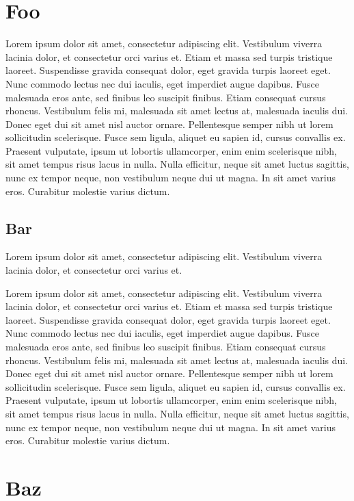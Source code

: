 

\chapter{Foo}

Lorem ipsum dolor sit amet, consectetur adipiscing elit. Vestibulum viverra
lacinia dolor, et consectetur orci varius et. Etiam et massa sed turpis
tristique laoreet. Suspendisse gravida consequat dolor, eget gravida turpis
laoreet eget. Nunc commodo lectus nec dui iaculis, eget imperdiet augue dapibus.
Fusce malesuada eros ante, sed finibus leo suscipit finibus. Etiam consequat
cursus rhoncus. Vestibulum felis mi, malesuada sit amet lectus at, malesuada
iaculis dui. Donec eget dui sit amet nisl auctor ornare. Pellentesque semper
nibh ut lorem sollicitudin scelerisque. Fusce sem ligula, aliquet eu sapien id,
cursus convallis ex. Praesent vulputate, ipsum ut lobortis ullamcorper, enim
enim scelerisque nibh, sit amet tempus risus lacus in nulla. Nulla efficitur,
neque sit amet luctus sagittis, nunc ex tempor neque, non vestibulum neque dui
ut magna. In sit amet varius eros. Curabitur molestie varius dictum.

\section{Bar}

Lorem ipsum dolor sit amet, consectetur adipiscing elit. Vestibulum viverra
lacinia dolor, et consectetur orci varius et.

Lorem ipsum dolor sit amet, consectetur adipiscing elit. Vestibulum viverra
lacinia dolor, et consectetur orci varius et. Etiam et massa sed turpis
tristique laoreet. Suspendisse gravida consequat dolor, eget gravida turpis
laoreet eget. Nunc commodo lectus nec dui iaculis, eget imperdiet augue dapibus.
Fusce malesuada eros ante, sed finibus leo suscipit finibus. Etiam consequat
cursus rhoncus. Vestibulum felis mi, malesuada sit amet lectus at, malesuada
iaculis dui. Donec eget dui sit amet nisl auctor ornare. Pellentesque semper
nibh ut lorem sollicitudin scelerisque. Fusce sem ligula, aliquet eu sapien id,
cursus convallis ex. Praesent vulputate, ipsum ut lobortis ullamcorper, enim
enim scelerisque nibh, sit amet tempus risus lacus in nulla. Nulla efficitur,
neque sit amet luctus sagittis, nunc ex tempor neque, non vestibulum neque dui
ut magna. In sit amet varius eros. Curabitur molestie varius dictum.


\chapter{Baz}

